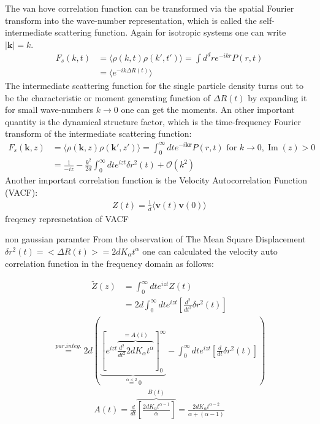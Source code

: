 \documentclass[
  a4paper,BCOR10mm,oneside,
  bibtotoc,idxtotoc,
  headsepline,footsepline,%
  fleqn,openbib
]{scrbook}
\begin{document}
The van hove correlation function can be transformed via the spatial Fourier transform into the wave-number representation, which is called the self-intermediate scattering function. Again for isotropic systems one can write $|\bm{k}|=k$.
\begin{align}
 F_{s}(k,t)&=\langle\rho(k,t) \rho(k',t')\rangle=\int d^{d}r e^{-i k r} P(r,t) \\
 &=\langle e^{-i k \Delta R(t)} \rangle
\end{align}
The intermediate scattering function for the single particle density turns out to be the characteristic or moment generating function of $\Delta R(t)$ by expanding it for small wave-numbers $k \rightarrow 0$ one can get the moments. An other important quantity is the dynamical structure factor, which is the time-frequency Fourier transform of the intermediate scattering function:
\begin{align}
 F_{s}(\bm{k},z)&=\langle\rho(\bm{k},z) \rho(\bm{k}',z')\rangle=\int_{0}^{\infty} d t e^{-i \bm{k} \bm{r}} P(r,t) \text{ for } k \rightarrow 0 , \operatorname{Im}(z) > 0 \\
 &= \frac{1}{-iz}-\frac{k^2}{2d}\int_{0}^{\infty} d t e^{izt} \delta r^2 (t) + \mathcal{O}(k^2)
\end{align}
Another important correlation function is the Velocity Autocorrelation Function (VACF):
\begin{align}
Z(t)= \frac{1}{d}\langle \bm{v}(t) \bm{v}(0) \rangle 
\end{align}
 freqency represnetation of VACF

 non gaussian paramter 
From the observation of The Mean Square Displacement  $\delta r^{2}(t)= < \Delta R(t)>=2dK_{\alpha}t^{\alpha}$ one can calculated the velocity auto correlation function in the frequency domain as follows:

\begin{align*}
 \tilde{Z}(z)&=\int_{0}^{\infty} d t e^{izt} Z(t) \\
 &=2 d \int_{0}^{\infty} d t e^{izt} \left[\frac{d^2}{dt^2}\delta r^2 (t) \right]
\end{align*}
\begin{align*}
  \stackrel{par. integ.}{=} 2d \left( \underbrace{\left [ e^{izt}\overbrace{ \frac{d^2}{dt^2} 2dK_{\alpha}t^{\alpha}}^{=A(t)} \right]_{0}^{\infty}}_{\stackrel{\alpha < 2} {=} 0}-\int_{0}^{\infty} d t e^{izt} \left[\frac{d}{dt}\delta r^2 (t)\right] \right) 
 \end{align*}
 \begin{align*}
 A(t)=\frac{d}{dt}\overbrace{ \left [\frac{2d K_{\alpha}t^{\alpha-1}}{\alpha} \right ]}^{B(t)}=\frac{2d K_{\alpha}t^{\alpha-2}}{\alpha+(\alpha-1)}
\end{align*}
\end{document}
